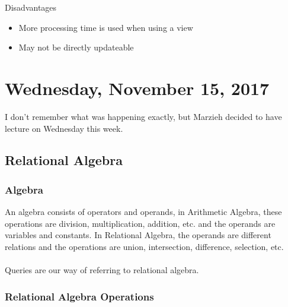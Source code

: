 \documentclass[12pt]{article}
\begin{document}
Disadvantages
\begin{itemize}
	\item{More processing time is used when using a view}
	\item{May not be directly updateable}
\end{itemize}

\newpage
 
\section{Wednesday, November 15, 2017}

I don't remember what was happening exactly, but Marzieh decided to have lecture on Wednesday this week.

\subsection{Relational Algebra}

\subsubsection{Algebra}

An algebra consists of operators and operands, in Arithmetic Algebra, these operations are division, multiplication, addition, etc. and the operands are variables and constants. In Relational Algebra, the operands are different relations and the operations are union, intersection, difference, selection, etc.\\
\\
Queries are our way of referring to relational algebra.

\subsubsection{Relational Algebra Operations}
\end{document}
